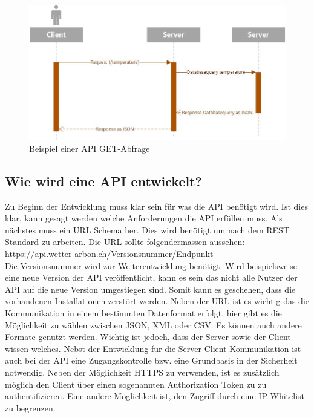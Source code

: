 \begin{figure}[h!]
	\centering
	\includegraphics[width=1\linewidth]{img/Sequenzdiagramm_API}
	\caption{Beispiel einer API GET-Abfrage}
	\label{img:Sequenzdiagramm_API}
\end{figure}


\subsection{Wie wird eine API entwickelt?}
Zu Beginn der Entwicklung muss klar sein für was die API benötigt wird. Ist dies klar, kann gesagt werden welche Anforderungen die API erfüllen muss. Als nächstes muss ein URL Schema her. Dies wird benötigt um nach dem REST Standard zu arbeiten. Die URL sollte folgendermassen aussehen: \\ https://api.wetter-arbon.ch/Versionsnummer/Endpunkt\\
Die Versionsnummer wird zur Weiterentwicklung benötigt. Wird beispielsweise eine neue Version der API veröffentlicht, kann es sein das nicht alle Nutzer der API auf die neue Version umgestiegen sind. Somit kann es geschehen, dass die vorhandenen Installationen zerstört werden. Neben der URL ist es wichtig das die Kommunikation in einem bestimmten Datenformat erfolgt, hier gibt es die Möglichkeit zu wählen zwischen JSON, XML oder CSV. Es können auch andere Formate genutzt werden. Wichtig ist jedoch, dass der Server sowie der Client wissen welches. Nebst der Entwicklung für die Server-Client Kommunikation ist auch bei der API eine Zugangskontrolle bzw. eine Grundbasis in der Sicherheit notwendig. Neben der Möglichkeit HTTPS zu verwenden, ist es zusätzlich möglich den Client über einen sogenannten Authorization Token zu zu authentifizieren. Eine andere Möglichkeit ist, den Zugriff durch eine IP-Whitelist zu begrenzen. \\


